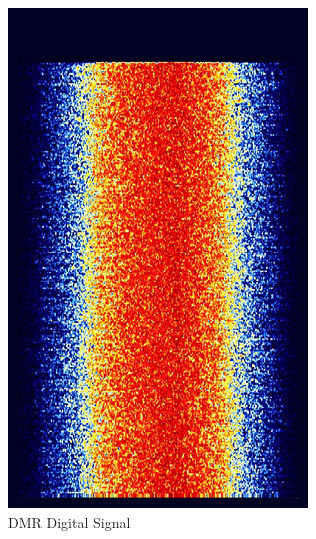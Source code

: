 \begin{figure}[h]
\begin{subfigure}[b]{0.2\textwidth}
        \includegraphics[width=\textwidth]{assets/osi/physical/signals/dmr.png}
        \caption{DMR Digital Signal}
        \label{fig:dmr_digital}
    \end{subfigure}
    \hspace{1em}
    \begin{subfigure}[b]{0.2\textwidth}
        \centering

\end{subfigure}
\end{figure}
